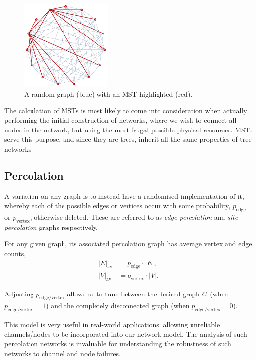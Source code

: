 \begin{figure}[!htbp]
\includegraphics[width=0.4\textwidth]{MST}
\caption{A random graph (blue) with an MST highlighted (red).} \label{fig:mst}
\end{figure}

The calculation of MSTs is most likely to come into consideration when actually performing the initial construction of networks, where we wish to connect all nodes in the network, but using the most frugal possible physical resources. MSTs serve this purpose, and since they are trees, inherit all the same properties of tree networks.

%
%

\subsection{Percolation}\label{sec:perc_topol}

A variation on any graph is to instead have a randomised implementation of it, whereby each of the possible edges or vertices occur with some probability, $p_\mathrm{edge}$ or $p_\mathrm{vertex}$, otherwise deleted. These are referred to as \textit{edge percolation} and \textit{site percolation} graphs respectively.

For any given graph, its associated percolation graph has average vertex and edge counts,
\begin{align}
|E|_\mathrm{av} &= p_\mathrm{edge}\cdot |E|,\nonumber\\
|V|_\mathrm{av} &= p_\mathrm{vertex}\cdot |V|.
\end{align}

Adjusting $p_\mathrm{edge/vertex}$ allows us to tune between the desired graph $G$ (when $p_\mathrm{edge/vertex}=1$) and the completely disconnected graph (when $p_\mathrm{edge/vertex}=0$).

This model is very useful in real-world applications, allowing unreliable channels/nodes to be incorporated into our network model. The analysis of such percolation networks is invaluable for understanding the robustness of such networks to channel and node failures.

